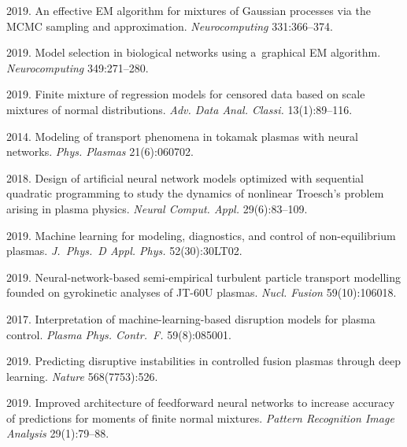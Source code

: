 \begin{multicols}{2}
{{\begin{thebibliography}{99}
 2019. An effective EM algorithm for mixtures of 
Gaussian processes via the MCMC sampling and approximation. 
\textit{Neurocomputing} 331:366--374.

 2019. Model selection in biological networks using 
 a~graphical EM algorithm. \textit{Neurocomputing} 349:271--280.

 2019. Finite mixture of regression models for censored data based on 
 scale mixtures of normal distributions. 
 \textit{Adv. Data Anal. Classi.} 13(1):89--116.

 2014. Modeling of transport phenomena in tokamak plasmas with neural networks. 
 \textit{Phys. Plasmas} 21(6):060702.

2018. Design of artificial neural network models optimized with sequential
 quadratic programming to study the dynamics of nonlinear Troesch's 
 problem arising in plasma physics. 
 \textit{Neural Comput. Appl.} 29(6):83--109.

 2019. Machine learning for modeling, diagnostics, and control 
 of non-equilibrium plasmas. \textit{J.~Phys.~D Appl. Phys.} 52(30):30LT02.

 2019. Neural-network-based semi-empirical turbulent particle transport 
 modelling founded on gyrokinetic analyses of JT-60U plasmas. 
 \textit{Nucl. Fusion} 59(10):106018.

 2017. Interpretation of machine-learning-based 
disruption models for plasma control. \textit{Plasma Phys. 
Contr.~F.} 59(8):085001.

 2019. Predicting disruptive instabilities in 
 controlled fusion plasmas through deep learning. \textit{Nature} 568(7753):526.

 2019. Improved architecture of feedforward neural networks 
 to increase accuracy of predictions for moments of finite 
 normal mixtures. \textit{Pattern Recognition Image Analysis} 29(1):79--88.


\end{thebibliography}}}
\end{multicols}
